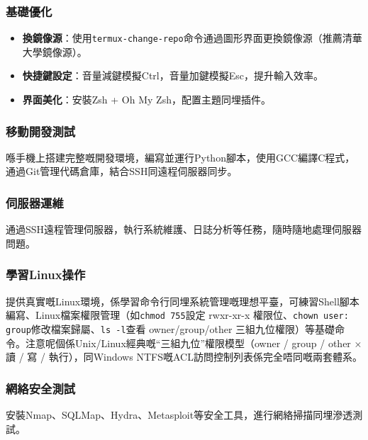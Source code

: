 \subsubsection*{基礎優化}

\begin{itemize}
  \item \textbf{換鏡像源}：使用\texttt{termux-\allowbreak change-\allowbreak repo}命令通過圖形界面更換鏡像源（推薦清華大學鏡像源）。
  \item \textbf{快捷鍵設定}：音量減鍵模擬Ctrl，音量加鍵模擬Esc，提升輸入效率。
  \item \textbf{界面美化}：安裝Zsh + Oh My Zsh，配置主題同埋插件。
\end{itemize}


\subsubsection*{移動開發測試}

喺手機上搭建完整嘅開發環境，編寫並運行Python腳本，使用GCC編譯C程式，通過Git管理代碼倉庫，結合SSH同遠程伺服器同步。

\subsubsection*{伺服器運維}

通過SSH遠程管理伺服器，執行系統維護、日誌分析等任務，隨時隨地處理伺服器問題。

\subsubsection*{學習Linux操作}

提供真實嘅Linux環境，係學習命令行同埋系統管理嘅理想平臺，可練習Shell腳本編寫、Linux檔案權限管理（如\texttt{chmod 755}設定 rwxr-xr-x 權限位、\texttt{chown user: group}修改檔案歸屬、\texttt{ls -\allowbreak l}查看 owner/group/other 三組九位權限）等基礎命令。注意呢個係Unix/Linux經典嘅“三組九位”權限模型（owner / group / other × 讀 / 寫 / 執行），同Windows NTFS嘅ACL訪問控制列表係完全唔同嘅兩套體系。

\subsubsection*{網絡安全測試}

安裝Nmap、SQLMap、Hydra、Metasploit等安全工具，進行網絡掃描同埋滲透測試。

